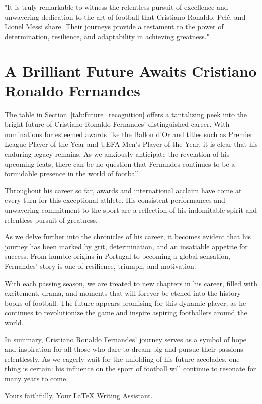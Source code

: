 \documentclass{article}
\begin{document}
"It is truly remarkable to witness the relentless pursuit of excellence and unwavering dedication to the art of football that Cristiano Ronaldo, Pelé, and Lionel Messi share. Their journeys provide a testament to the power of determination, resilience, and adaptability in achieving greatness."

 \section*{A Brilliant Future Awaits Cristiano Ronaldo Fernandes}

The table in Section~\ref{tab:future_recognition} offers a tantalizing peek into the bright future of Cristiano Ronaldo Fernandes' distinguished career. With nominations for esteemed awards like the Ballon d'Or and titles such as Premier League Player of the Year and UEFA Men's Player of the Year, it is clear that his enduring legacy remains. As we anxiously anticipate the revelation of his upcoming feats, there can be no question that Fernandes continues to be a formidable presence in the world of football.

Throughout his career so far, awards and international acclaim have come at every turn for this exceptional athlete. His consistent performances and unwavering commitment to the sport are a reflection of his indomitable spirit and relentless pursuit of greatness.

As we delve further into the chronicles of his career, it becomes evident that his journey has been marked by grit, determination, and an insatiable appetite for success. From humble origins in Portugal to becoming a global sensation, Fernandes' story is one of resilience, triumph, and motivation.

With each passing season, we are treated to new chapters in his career, filled with excitement, drama, and moments that will forever be etched into the history books of football. The future appears promising for this dynamic player, as he continues to revolutionize the game and inspire aspiring footballers around the world.

In summary, Cristiano Ronaldo Fernandes' journey serves as a symbol of hope and inspiration for all those who dare to dream big and pursue their passions relentlessly. As we eagerly wait for the unfolding of his future accolades, one thing is certain: his influence on the sport of football will continue to resonate for many years to come.

Yours faithfully,
Your LaTeX Writing Assistant.
\end{document}
